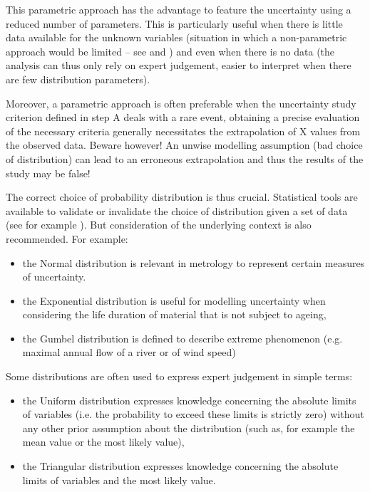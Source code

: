 {
This parametric approach has the advantage to feature the uncertainty using a reduced number of parameters. This is particularly useful when there is little data available for the unknown variables (situation in which a non-parametric approach would be limited -- see  and ) and even when there is no data (the analysis can thus only rely on expert judgement, easier to interpret when there are few distribution parameters). \vspace{2mm}

Moreover, a parametric approach is often preferable when the uncertainty study criterion defined in step A deals with a rare event, obtaining a precise evaluation of the necessary criteria generally necessitates the extrapolation of X values from the observed data. Beware however! An unwise modelling assumption (bad choice of distribution) can lead to an erroneous extrapolation and thus the results of the study may be false! \vspace{2mm}

The correct choice of probability distribution is thus crucial. Statistical tools are available to validate or invalidate the choice of distribution given a set of data (see for example  ). But consideration of the underlying context is also recommended. For example:
\begin{itemize}
\item    the Normal distribution is relevant in metrology to represent certain measures of uncertainty.
\item    the Exponential distribution is useful for modelling uncertainty when considering the life duration of material that is not subject to ageing,
\item    the Gumbel distribution is defined to describe extreme phenomenon (e.g. maximal annual flow of a river or of wind speed)
\end{itemize}
\vspace{2mm}

Some distributions are often used to express expert judgement in simple terms:
\begin{itemize}
\item the Uniform distribution expresses knowledge concerning the absolute limits of variables (i.e. the probability to exceed these limits is strictly zero) without any other prior assumption about the distribution (such as, for example the mean value or the most likely value),
\item the Triangular distribution expresses knowledge concerning the absolute limits of variables and the most likely value.
\end{itemize}

}
